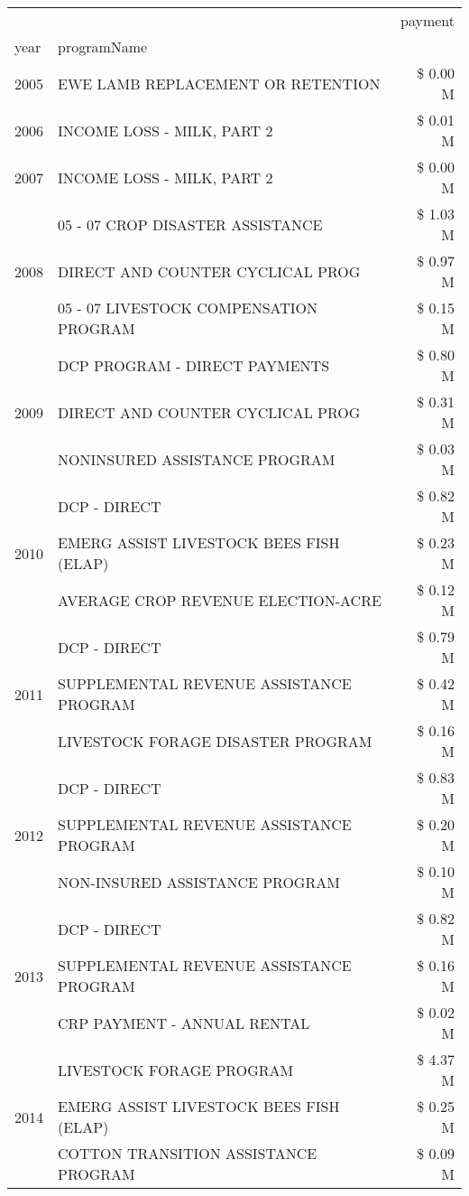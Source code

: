 \begin{tabular}{llr}
\toprule
 &  & payment \\
year & programName &  \\
\midrule
2005 & EWE LAMB REPLACEMENT OR RETENTION & \$ 0.00 M \\
\cline{1-3}
2006 & INCOME LOSS - MILK, PART 2 & \$ 0.01 M \\
\cline{1-3}
2007 & INCOME LOSS - MILK, PART 2 & \$ 0.00 M \\
\cline{1-3}
\multirow[t]{3}{*}{2008} & 05 - 07 CROP DISASTER ASSISTANCE & \$ 1.03 M \\
 & DIRECT AND COUNTER CYCLICAL PROG & \$ 0.97 M \\
 & 05 - 07 LIVESTOCK COMPENSATION PROGRAM & \$ 0.15 M \\
\cline{1-3}
\multirow[t]{3}{*}{2009} & DCP PROGRAM - DIRECT PAYMENTS & \$ 0.80 M \\
 & DIRECT AND COUNTER CYCLICAL PROG & \$ 0.31 M \\
 & NONINSURED ASSISTANCE PROGRAM & \$ 0.03 M \\
\cline{1-3}
\multirow[t]{3}{*}{2010} & DCP - DIRECT & \$ 0.82 M \\
 & EMERG ASSIST LIVESTOCK BEES FISH (ELAP) & \$ 0.23 M \\
 & AVERAGE CROP REVENUE ELECTION-ACRE & \$ 0.12 M \\
\cline{1-3}
\multirow[t]{3}{*}{2011} & DCP - DIRECT & \$ 0.79 M \\
 & SUPPLEMENTAL REVENUE ASSISTANCE PROGRAM & \$ 0.42 M \\
 & LIVESTOCK FORAGE DISASTER PROGRAM & \$ 0.16 M \\
\cline{1-3}
\multirow[t]{3}{*}{2012} & DCP - DIRECT & \$ 0.83 M \\
 & SUPPLEMENTAL REVENUE ASSISTANCE PROGRAM & \$ 0.20 M \\
 & NON-INSURED ASSISTANCE PROGRAM & \$ 0.10 M \\
\cline{1-3}
\multirow[t]{3}{*}{2013} & DCP - DIRECT & \$ 0.82 M \\
 & SUPPLEMENTAL REVENUE ASSISTANCE PROGRAM & \$ 0.16 M \\
 & CRP PAYMENT - ANNUAL RENTAL & \$ 0.02 M \\
\cline{1-3}
\multirow[t]{3}{*}{2014} & LIVESTOCK FORAGE PROGRAM & \$ 4.37 M \\
 & EMERG ASSIST LIVESTOCK BEES FISH (ELAP) & \$ 0.25 M \\
 & COTTON TRANSITION ASSISTANCE PROGRAM & \$ 0.09 M \\

\end{tabular}
